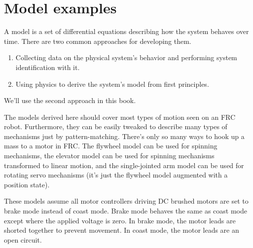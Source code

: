 
\chapter{Model examples}

A \gls{model} is a set of differential equations describing how the \gls{system}
behaves over time. There are two common approaches for developing them.

\begin{enumerate}
  \item Collecting data on the physical system's behavior and performing
    \gls{system} identification with it.
  \item Using physics to derive the \gls{system}'s model from first principles.
\end{enumerate}

We'll use the second approach in this book.

The \glspl{model} derived here should cover most types of motion seen on an FRC
robot. Furthermore, they can be easily tweaked to describe many types of
mechanisms just by pattern-matching. There's only so many ways to hook up a mass
to a motor in FRC. The flywheel \gls{model} can be used for spinning mechanisms,
the elevator \gls{model} can be used for spinning mechanisms transformed to
linear motion, and the single-jointed arm \gls{model} can be used for rotating
servo mechanisms (it's just the flywheel \gls{model} augmented with a position
\gls{state}).

These \glspl{model} assume all motor controllers driving DC brushed motors are
set to brake mode instead of coast mode. Brake mode behaves the same as coast
mode except where the applied voltage is zero. In brake mode, the motor leads
are shorted together to prevent movement. In coast mode, the motor leads are an
open circuit.

\renewcommand*{\chapterpath}{\partpath/model-examples}







